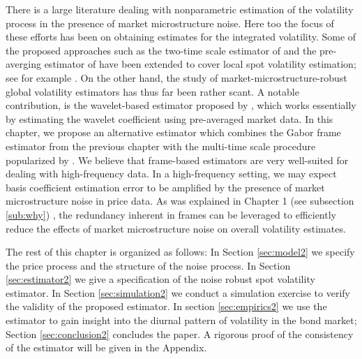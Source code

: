 There is a large literature dealing with nonparametric estimation of the volatility process in the presence of market microstructure noise. Here too the focus of these efforts has been on obtaining estimates for the integrated volatility. Some of the proposed approaches such as the two-time scale estimator of \cite{Zhang2005} and the pre-averging estimator of \cite{Podolskij2007} have been extended to cover local spot volatility estimation; see for example \cite{Zu2014}. On the other hand,  the study of market-microstructure-robust global volatility estimators has thus far been rather scant. A notable contribution, is the wavelet-based estimator proposed by \cite{Hoffmann2012}, which works essentially by estimating the wavelet coefficient using pre-averaged market data. In this chapter, we propose an alternative estimator which combines the Gabor frame estimator from the previous chapter with the multi-time scale procedure popularized by \cite{Zhang2005}. We believe that frame-based estimators are very well-suited for dealing with high-frequency data. In a high-frequency setting, we may expect basis coefficient estimation error to be amplified by the presence of market microstructure noise in price data. As was explained in Chapter 1 (see subsection \ref{sub:why}) , the redundancy inherent in frames can be leveraged to efficiently reduce the effects of market microstructure noise on overall volatility estimates. 

The rest of this chapter is organized as follows: In Section \ref{sec:model2} we specify the price process and the structure of the noise process. In Section \ref{sec:estimator2} we give a specification of the noise robust spot volatility estimator. In Section \ref{sec:simulation2} we conduct a simulation exercise to verify the validity of the proposed estimator. In section \ref{sec:empirics2} we use the estimator to gain insight into the diurnal pattern of volatility in the bond market; Section \ref{sec:conclusion2} concludes the paper. A rigorous proof of the consistency of the estimator will be given in the Appendix. 
